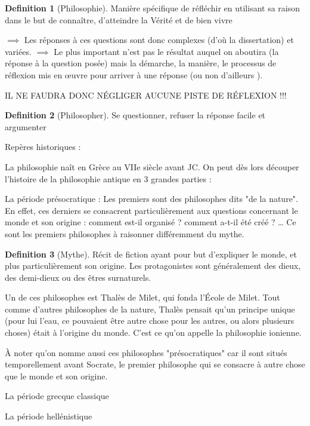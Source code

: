 \documentclass[french]{book}
\theoremstyle{definition}
\newtheorem*{dfn}{Definition}
\begin{document}
\begin{dfn}[Philosophie]
	Manière spécifique de réfléchir en utilisant sa raison dans le but de connaître, d'atteindre la Vérité et de bien vivre
\end{dfn}


$\implies$ Les réponses à ces questions sont donc complexes (d'où la dissertation) et variées.
$\implies$ Le plus important n'est pas le résultat auquel on aboutira (la réponse à la question posée) mais la démarche, la manière, le processus de réflexion mis en œuvre pour arriver à une réponse (ou non d'ailleurs ).

IL NE FAUDRA DONC NÉGLIGER AUCUNE PISTE DE RÉFLEXION !!!

\begin{dfn}[Philosopher]
	Se questionner, refuser la réponse facile et argumenter
\end{dfn}



Repères historiques :

La philosophie naît en Grèce au VIIe siècle avant JC.
On peut dès lors découper l'histoire de la philosophie antique en 3 grandes parties :

La période présocratique :
Les premiers sont des philosophes dits "de la nature". En effet, ces derniers se consacrent particulièrement aux questions concernant le monde et son origine : comment est-il organisé ? comment a-t-il été créé ? … Ce sont les premiers philosophes à raisonner différemment du mythe.

\begin{dfn}[Mythe] 
Récit de fiction ayant pour but d'expliquer le monde, et plus particulièrement son origine. Les protagonistes sont généralement des dieux, des demi-dieux ou des êtres surnaturels.
\end{dfn}


Un de ces philosophes est Thalès de Milet, qui fonda l'École de Milet. Tout comme d'autres philosophes de la nature, Thalès pensait qu'un principe unique (pour lui l'eau, ce pouvaient être autre chose pour les autres, ou alors plusieurs choses) était à l'origine du monde. C'est ce qu'on appelle la philosophie ionienne.

À noter qu'on nomme aussi ces philosophes "présocratiques" car il sont situés temporellement avant Socrate, le premier philosophe qui se consacre à autre chose que le monde et son origine.

La période grecque classique


La période hellénistique 
\end{document}
